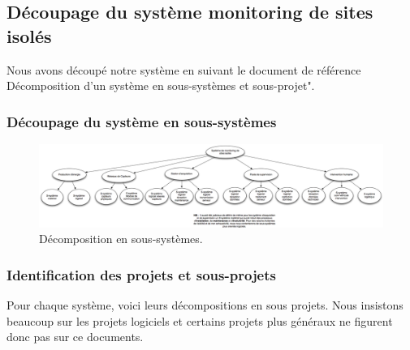 \subsection{Découpage du système monitoring de sites isolés}
Nous avons découpé notre système en suivant le document de référence \og Décomposition d'un système en sous-systèmes et sous-projet".

\subsubsection{Découpage du système en sous-systèmes}


\begin{figure}[H]
\centering
\includegraphics[scale=0.4, angle=90]{png/graphDecompoSousSystemes.png}
\caption*{Décomposition en sous-systèmes.}
\end{figure}


\subsubsection{Identification des projets et sous-projets}
Pour chaque système, voici leurs décompositions en sous projets. Nous insistons beaucoup sur les projets logiciels et certains projets plus \og généraux \fg ne figurent donc pas sur ce documents.

